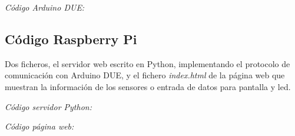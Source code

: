 \documentclass[]{article}
\begin{document}
\textit{Código Arduino DUE:}


\subsection{Código Raspberry Pi}

Dos ficheros, el servidor web escrito en Python, implementando el protocolo de comunicación con Arduino DUE, y el fichero \textit{index.html} de la página web que muestran la información de los sensores o entrada de datos para pantalla y led.

\textit{Código servidor Python:}


\textit{Código página web:}

\end{document}

